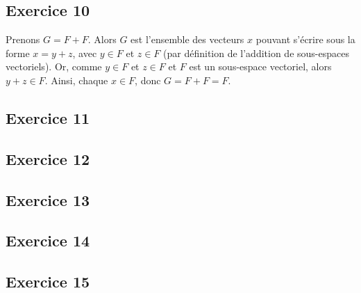 \documentclass[12pt]{book}
\begin{document}
\subsection*{Exercice 10}

Prenons $G=F+F$. Alors $G$ est l’ensemble des vecteurs $x$ pouvant s’écrire sous la forme $x=y+z$, avec $y\in F$ et $z\in F$ (par définition de l’addition de sous-espaces vectoriels). Or, comme $y\in F$ et $z\in F$ et $F$ est un sous-espace vectoriel, alors $y+z\in F$. Ainsi, chaque $x\in F$, donc $G=F+F=F$.

\subsection*{Exercice 11}



\subsection*{Exercice 12}


\subsection*{Exercice 13}


\subsection*{Exercice 14}


\subsection*{Exercice 15}
\end{document}
